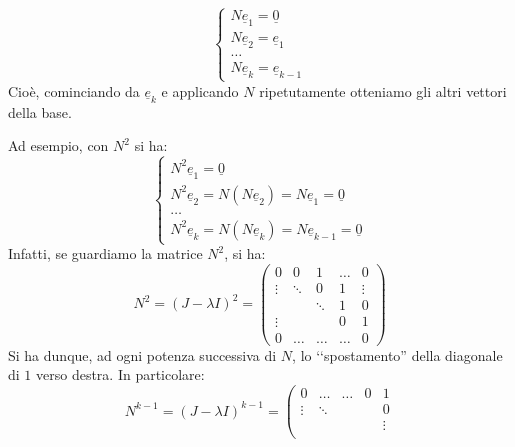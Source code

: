 \begin{observe}
\begin{equation*}
\begin{cases}
		N\underline{e}_1=\underline{0}\\
		N\underline{e}_2=\underline{e}_1\\
		\ldots\\
		N\underline{e}_k=\underline{e}_{k-1}
	\end{cases}
\end{equation*}
Cioè, cominciando da $\underline{e}_k$ e applicando $N$ ripetutamente otteniamo gli altri vettori della base.
\begin{center}
\end{center}
Ad esempio, con $N^2$ si ha:
\begin{equation*}
	\begin{cases}
		N^2\underline{e}_1=\underline{0}\\
		N^2\underline{e}_2=N\left(N\underline{e}_2\right)=N\underline{e}_1=\underline{0}\\
		\ldots\\
		N^2\underline{e}_k=N\left(N\underline{e}_k\right)=N\underline{e}_{k-1}=\underline{0}
	\end{cases}
\end{equation*}
Infatti, se guardiamo la matrice $N^2$, si ha:
		\begin{equation*}
	N^2=\left(J-\lambda I\right)^2= \left(
	\begin{array}{ccccc}
		0		& 0 		&  1		& \ldots 	& 0 \\
		\vdots	& \ddots 	& 0			& 1			& \vdots\\
				&  			& \ddots	& 1 		& 0\\
		\vdots	& 			&   		& 0 		& 1\\
		0		&  \dots  	&  \dots 	& \dots 		& 0
	\end{array}
	\right)
\end{equation*}
Si ha dunque, ad ogni potenza successiva di $N$, lo ‘‘spostamento'' della diagonale di $1$ verso destra. In particolare:
		\begin{equation*}
	N^{k-1}=\left(J-\lambda I\right)^{k-1}= \left(
	\begin{array}{ccccc}
		0		& \dots 	&  	\dots		& 0 	& 1 \\
		\vdots	& \ddots 	& 			& 		& 0\\
				&  			& 			&  		& \vdots \\

\end{array}
\end{equation*}
\end{observe}
